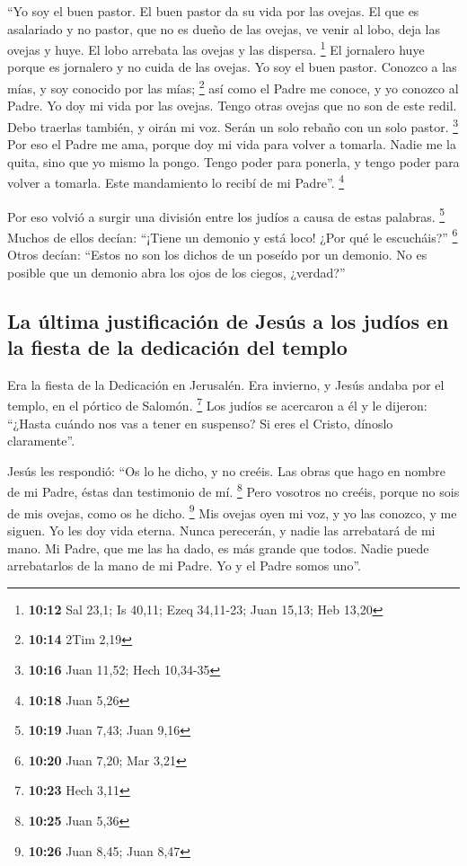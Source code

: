 \begin{paracol}{2}
 ``Yo soy el buen pastor. El buen pastor da su vida por
las ovejas.  El que es asalariado y no pastor, que no es
dueño de las ovejas, ve venir al lobo, deja las ovejas y huye. El lobo
arrebata las ovejas y las dispersa. \footnote{\textbf{10:12} Sal 23,1;
  Is 40,11; Ezeq 34,11-23; Juan 15,13; Heb 13,20}  El
jornalero huye porque es jornalero y no cuida de las ovejas.
 Yo soy el buen pastor. Conozco a las mías, y soy
conocido por las mías; \footnote{\textbf{10:14} 2Tim 2,19}
 así como el Padre me conoce, y yo conozco al Padre. Yo
doy mi vida por las ovejas.  Tengo otras ovejas que no
son de este redil. Debo traerlas también, y oirán mi voz. Serán un solo
rebaño con un solo pastor. \footnote{\textbf{10:16} Juan 11,52; Hech
  10,34-35}  Por eso el Padre me ama, porque doy mi vida
para volver a tomarla.  Nadie me la quita, sino que yo
mismo la pongo. Tengo poder para ponerla, y tengo poder para volver a
tomarla. Este mandamiento lo recibí de mi Padre''. \footnote{\textbf{10:18}
  Juan 5,26}

 Por eso volvió a surgir una división entre los judíos a
causa de estas palabras. \footnote{\textbf{10:19} Juan 7,43; Juan 9,16}
 Muchos de ellos decían: ``¡Tiene un demonio y está loco!
¿Por qué le escucháis?'' \footnote{\textbf{10:20} Juan 7,20; Mar 3,21}
 Otros decían: ``Estos no son los dichos de un poseído
por un demonio. No es posible que un demonio abra los ojos de los
ciegos, ¿verdad?''

\hypertarget{la-uxfaltima-justificaciuxf3n-de-jesuxfas-a-los-juduxedos-en-la-fiesta-de-la-dedicaciuxf3n-del-templo}{%
\subsection{La última justificación de Jesús a los judíos en la fiesta
de la dedicación del
templo}\label{la-uxfaltima-justificaciuxf3n-de-jesuxfas-a-los-juduxedos-en-la-fiesta-de-la-dedicaciuxf3n-del-templo}}

 Era la fiesta de la Dedicación en Jerusalén.
 Era invierno, y Jesús andaba por el templo, en el
pórtico de Salomón. \footnote{\textbf{10:23} Hech 3,11} 
Los judíos se acercaron a él y le dijeron: ``¿Hasta cuándo nos vas a
tener en suspenso? Si eres el Cristo, dínoslo claramente''.

 Jesús les respondió: ``Os lo he dicho, y no creéis. Las
obras que hago en nombre de mi Padre, éstas dan testimonio de mí.
\footnote{\textbf{10:25} Juan 5,36}  Pero vosotros no
creéis, porque no sois de mis ovejas, como os he dicho. \footnote{\textbf{10:26}
  Juan 8,45; Juan 8,47}  Mis ovejas oyen mi voz, y yo las
conozco, y me siguen.  Yo les doy vida eterna. Nunca
perecerán, y nadie las arrebatará de mi mano.  Mi Padre,
que me las ha dado, es más grande que todos. Nadie puede arrebatarlos de
la mano de mi Padre.  Yo y el Padre somos uno''.


\end{paracol}
